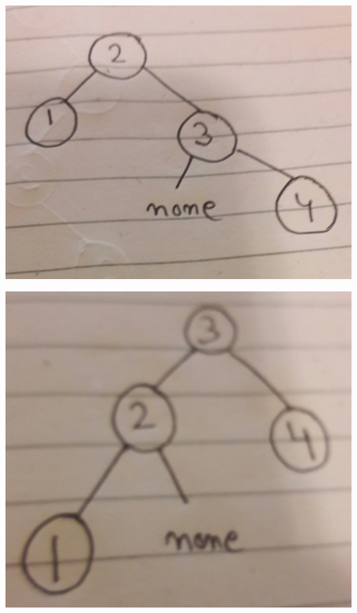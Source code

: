 \documentclass{article}
\begin{document}
\includegraphics[scale=0.05]{11.jpg}




\includegraphics[scale=0.05]{12.jpg}
\end{document}
